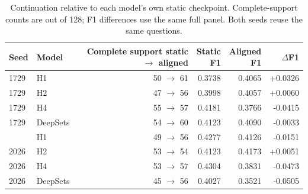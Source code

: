 \begin{table}[!htbp]
\centering\small
\caption{Continuation relative to each model's own static checkpoint. Complete-support counts are out of 128; F1 differences use the same full panel. Both seeds reuse the same questions.}\label{tab:paired}
\begin{tabular}{@{}llrrrr@{}}\toprule
Seed & Model & \shortstack{Complete support\\static $\to$ aligned} & \shortstack{Static\\F1} & \shortstack{Aligned\\F1} & $\Delta$F1 \\
\midrule
1729 & H1 & 50 $\to$ 61 & 0.3738 & 0.4065 & +0.0326 \\
1729 & H2 & 47 $\to$ 56 & 0.3998 & 0.4057 & +0.0060 \\
1729 & H4 & 55 $\to$ 57 & 0.4181 & 0.3766 & -0.0415 \\
1729 & DeepSets & 54 $\to$ 60 & 0.4123 & 0.4090 & -0.0033 \\
\addlinespace 2026 & H1 & 49 $\to$ 56 & 0.4277 & 0.4126 & -0.0151 \\
2026 & H2 & 53 $\to$ 54 & 0.4123 & 0.4173 & +0.0051 \\
2026 & H4 & 53 $\to$ 57 & 0.4304 & 0.3831 & -0.0473 \\
2026 & DeepSets & 45 $\to$ 56 & 0.4027 & 0.3521 & -0.0505 \\
\bottomrule\end{tabular}
\end{table}
